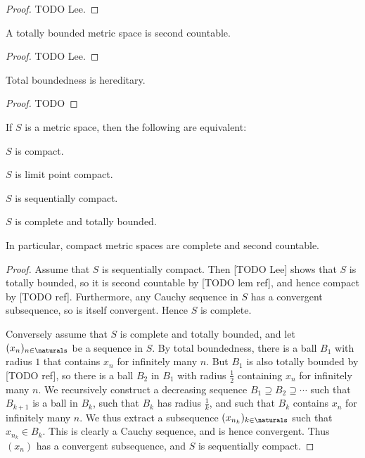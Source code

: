 \documentclass[article, a4paper, 11pt, oneside]{memoir}
\numberwithin{equation}{chapter}
\begin{document}
\begin{proof}
    TODO Lee.
\end{proof}


\begin{lemma}
    A totally bounded metric space is second countable.
\end{lemma}

\begin{proof}
    TODO Lee.
\end{proof}


\begin{lemma}
    Total boundedness is hereditary.
\end{lemma}

\begin{proof}
    TODO
\end{proof}


\begin{theorem}
    If $S$ is a metric space, then the following are equivalent:
    \begin{enumthm}
        \item $S$ is compact.
        \item $S$ is limit point compact.
        \item $S$ is sequentially compact.
        \item $S$ is complete and totally bounded.
    \end{enumthm}
    In particular, compact metric spaces are complete and second countable.
\end{theorem}

\begin{proof}
    Assume that $S$ is sequentially compact. Then [TODO Lee] shows that $S$ is totally bounded, so it is second countable by [TODO lem ref], and hence compact by [TODO ref]. Furthermore, any Cauchy sequence in $S$ has a convergent subsequence, so is itself convergent. Hence $S$ is complete.

    Conversely assume that $S$ is complete and totally bounded, and let $(x_n)_{n \in \naturals}$ be a sequence in $S$. By total boundedness, there is a ball $B_1$ with radius $1$ that contains $x_n$ for infinitely many $n$. But $B_1$ is also totally bounded by [TODO ref], so there is a ball $B_2$ in $B_1$ with radius $\tfrac{1}{2}$ containing $x_n$ for infinitely many $n$. We recursively construct a decreasing sequence $B_1 \supseteq B_2 \supseteq \cdots$ such that $B_{k+1}$ is a ball in $B_k$, such that $B_k$ has radius $\tfrac{1}{k}$, and such that $B_k$ contains $x_n$ for infinitely many $n$. We thus extract a subsequence $(x_{n_k})_{k \in \naturals}$ such that $x_{n_k} \in B_k$. This is clearly a Cauchy sequence, and is hence convergent. Thus $(x_n)$ has a convergent subsequence, and $S$ is sequentially compact.
\end{proof}
\end{document}
